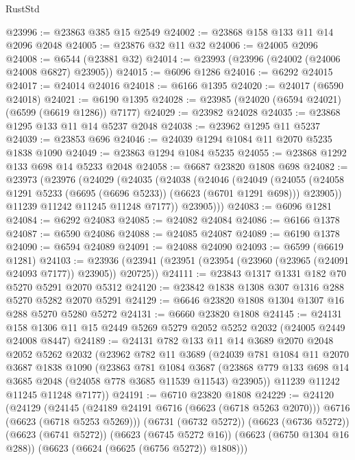 \begin{lexlean}{RustStd}
\begin{coremodule}
@23996 := @23863 @385 @15 @2549
@24002 := @23868 @158 @133 @11 @14 @2096 @2048
@24005 := @23876 @32 @11 @32
@24006 := @24005 @2096
@24008 := @6544 (@23881 @32)
@24014 := @23993 (@23996 (@24002 (@24006 @24008 @6827) @23905))
@24015 := @6096 @1286
@24016 := @6292 @24015
@24017 := @24014 @24016
@24018 := @6166 @1395
@24020 := @24017 (@6590 @24018)
@24021 := @6190 @1395
@24028 := @23985 (@24020 (@6594 @24021) (@6599 (@6619 @1286)) @7177)
@24029 := @23982 @24028
@24035 := @23868 @1295 @133 @11 @14 @5237 @2048
@24038 := @23962 @1295 @11 @5237
@24039 := @23853 @696
@24046 := @24039 @1294 @1084 @11 @2070 @5235 @1838 @1090
@24049 := @23863 @1294 @1084 @5235
@24055 := @23868 @1292 @133 @698 @14 @5233 @2048
@24058 := @6687 @23820 @1808 @698
@24082 := @23973
    (@23976
      (@24029
        (@24035
          (@24038
            (@24046
              (@24049
                (@24055
                  (@24058 @1291 @5233 (@6695 (@6696 @5233)) (@6623 (@6701 @1291 @698)))
                  @23905))
              @11239
              @11242
              @11245
              @11248
              @7177))
          @23905)))
@24083 := @6096 @1281
@24084 := @6292 @24083
@24085 := @24082 @24084
@24086 := @6166 @1378
@24087 := @6590 @24086
@24088 := @24085 @24087
@24089 := @6190 @1378
@24090 := @6594 @24089
@24091 := @24088 @24090
@24093 := @6599 (@6619 @1281)
@24103 := @23936 (@23941 (@23951 (@23954 (@23960 (@23965 (@24091 @24093 @7177)) @23905)) @20725))
@24111 := @23843 @1317 @1331 @182 @70 @5270 @5291 @2070 @5312
@24120 := @23842 @1838 @1308 @307 @1316 @288 @5270 @5282 @2070 @5291
@24129 := @6646 @23820 @1808 @1304 @1307 @16 @288 @5270 @5280 @5272
@24131 := @6660 @23820 @1808
@24145 := @24131 @158 @1306 @11 @15 @2449 @5269 @5279 @2052 @5252 @2032 (@24005 @2449 @24008 @8447)
@24189 := @24131
    @782
    @133
    @11
    @14
    @3689
    @2070
    @2048
    @2052
    @5262
    @2032
    (@23962
      @782
      @11
      @3689
      (@24039
        @781
        @1084
        @11
        @2070
        @3687
        @1838
        @1090
        (@23863
          @781
          @1084
          @3687
          (@23868 @779 @133 @698 @14 @3685 @2048 (@24058 @778 @3685 @11539 @11543) @23905))
        @11239
        @11242
        @11245
        @11248
        @7177))
@24191 := @6710 @23820 @1808
@24229 := @24120
    (@24129
      (@24145 (@24189 @24191 @6716 (@6623 (@6718 @5263 @2070))) @6716 (@6623 (@6718 @5253 @5269)))
      (@6731 (@6732 @5272))
      (@6623 (@6736 @5272))
      (@6623 (@6741 @5272))
      (@6623 (@6745 @5272 @16))
      (@6623 (@6750 @1304 @16 @288))
      (@6623 (@6624 (@6625 (@6756 @5272)) @1808)))

\end{coremodule}
\end{lexlean}
